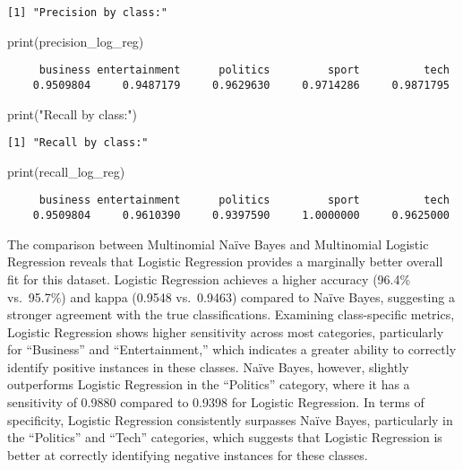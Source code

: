 \documentclass[
  12pt,
  letterpaper,
  DIV=11,
  numbers=noendperiod]{scrartcl}
\newenvironment{Shaded}{\begin{snugshade}}{\end{snugshade}}
\newcommand{\FunctionTok}[1]{\textcolor[rgb]{0.28,0.35,0.67}{#1}}
\newcommand{\NormalTok}[1]{\textcolor[rgb]{0.00,0.23,0.31}{#1}}
\newcommand{\StringTok}[1]{\textcolor[rgb]{0.13,0.47,0.30}{#1}}
\begin{document}
\begin{verbatim}
[1] "Precision by class:"
\end{verbatim}

\begin{Shaded}
\begin{Highlighting}[]
\FunctionTok{print}\NormalTok{(precision\_log\_reg)}
\end{Highlighting}
\end{Shaded}

\begin{verbatim}
     business entertainment      politics         sport          tech 
    0.9509804     0.9487179     0.9629630     0.9714286     0.9871795 
\end{verbatim}

\begin{Shaded}
\begin{Highlighting}[]
\FunctionTok{print}\NormalTok{(}\StringTok{"Recall by class:"}\NormalTok{)}
\end{Highlighting}
\end{Shaded}

\begin{verbatim}
[1] "Recall by class:"
\end{verbatim}

\begin{Shaded}
\begin{Highlighting}[]
\FunctionTok{print}\NormalTok{(recall\_log\_reg)}
\end{Highlighting}
\end{Shaded}

\begin{verbatim}
     business entertainment      politics         sport          tech 
    0.9509804     0.9610390     0.9397590     1.0000000     0.9625000 
\end{verbatim}

The comparison between Multinomial Naïve Bayes and Multinomial Logistic
Regression reveals that Logistic Regression provides a marginally better
overall fit for this dataset. Logistic Regression achieves a higher
accuracy (96.4\% vs.~95.7\%) and kappa (0.9548 vs.~0.9463) compared to
Naïve Bayes, suggesting a stronger agreement with the true
classifications. Examining class-specific metrics, Logistic Regression
shows higher sensitivity across most categories, particularly for
``Business'' and ``Entertainment,'' which indicates a greater ability to
correctly identify positive instances in these classes. Naïve Bayes,
however, slightly outperforms Logistic Regression in the ``Politics''
category, where it has a sensitivity of 0.9880 compared to 0.9398 for
Logistic Regression. In terms of specificity, Logistic Regression
consistently surpasses Naïve Bayes, particularly in the ``Politics'' and
``Tech'' categories, which suggests that Logistic Regression is better
at correctly identifying negative instances for these classes.
\end{document}
